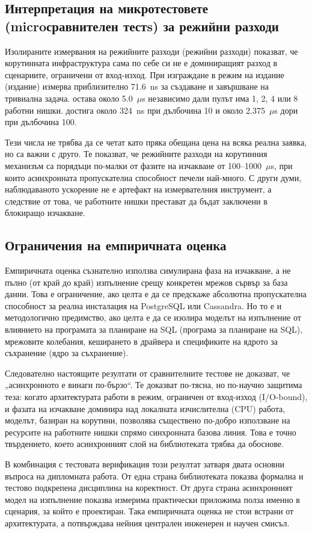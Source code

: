 \subsection{Интерпретация на микротестовете (microсравнителен тестs) за режийни разходи}

Изолираните измервания на режийните разходи (режийни разходи) показват, че корутинната инфраструктура сама по себе си не е доминиращият разход в сценариите, ограничени от вход-изход. При изграждане в режим на издание (издание)  измерва приблизително 71.6~ns за създаване и завършване на тривиална задача.  остава около 5.0~$\mu$s независимо дали пулът има 1, 2, 4 или 8 работни нишки.  достига около 324~ns при дълбочина 10 и около 2.375~$\mu$s дори при дълбочина 100.

Тези числа не трябва да се четат като пряка обещана цена на всяка реална заявка, но са важни с друго. Те показват, че режийните разходи на корутинния механизъм са порядъци по-малки от фазите на изчакване от 100--1000~$\mu$s, при които асинхронната пропускателна способност печели най-много. С други думи, наблюдаваното ускорение не е артефакт на измервателния инструмент, а следствие от това, че работните нишки престават да бъдат заключени в блокиращо изчакване.

\subsection{Ограничения на емпиричната оценка}

Емпиричната оценка съзнателно използва симулирана фаза на изчакване, а не пълно (от край до край) изпълнение срещу конкретен мрежов сървър за база данни. Това е ограничение, ако целта е да се предскаже абсолютна пропускателна способност за реална инсталация на PostgreSQL или Cassandra. Но то е и методологично предимство, ако целта е да се изолира моделът на изпълнение от влиянието на програмата за планиране на SQL (програма за планиране на SQL), мрежовите колебания, кеширането в драйвера и спецификите на ядрото за съхранение (ядро за съхранение).

Следователно настоящите резултати от сравнителните тестове не доказват, че „асинхронното е винаги по-бързо“. Те доказват по-тясна, но по-научно защитима теза: когато архитектурата работи в режим, ограничен от вход-изход (I/O-bound), и фазата на изчакване доминира над локалната изчислителна (CPU) работа, моделът, базиран на корутини, позволява съществено по-добро използване на ресурсите на работните нишки спрямо синхронната базова линия. Това е точно твърдението, което асинхронният слой на библиотеката трябва да обоснове.

В комбинация с тестовата верификация този резултат затваря двата основни въпроса на дипломната работа. От една страна библиотеката показва формална и тестово подкрепена дисциплина на коректност. От друга страна асинхронният модел на изпълнение показва измерима практически приложима полза именно в сценария, за който е проектиран. Така емпиричната оценка не стои встрани от архитектурата, а потвърждава нейния централен инженерен и научен смисъл.
